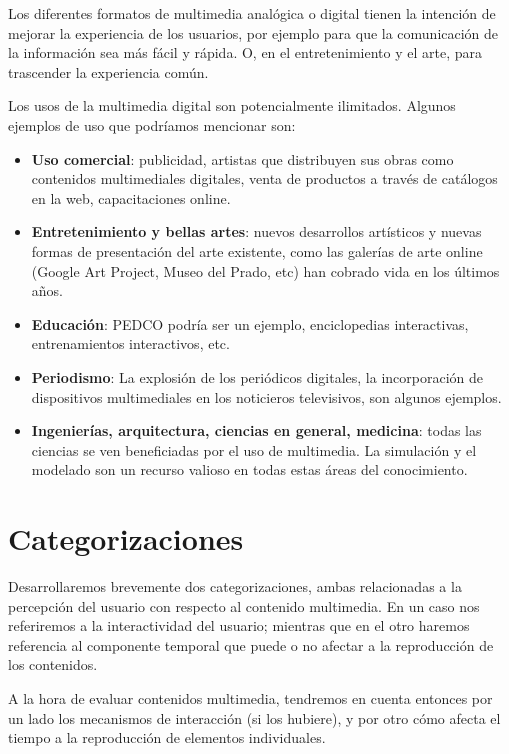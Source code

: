 \documentclass[12pt]{article}
\begin{document}
Los diferentes formatos de multimedia analógica o digital tienen la 
intención de mejorar la experiencia de los usuarios, por ejemplo para 
que la comunicación de la información sea más fácil y rápida. O, en 
el entretenimiento y el arte, para trascender la experiencia común.\cite{wikipmmes} 

Los usos de la multimedia digital son potencialmente ilimitados. Algunos 
ejemplos de uso que podríamos mencionar son:  

\begin{itemize}
\item {\bf Uso comercial}: publicidad, artistas que distribuyen sus obras como contenidos 
multimediales digitales, venta de productos a través de catálogos en la web, capacitaciones online. 
\item {\bf Entretenimiento y bellas artes}: nuevos desarrollos artísticos y nuevas formas 
de presentación del arte existente, como las galerías de arte online (Google Art Project, 
Museo del Prado, etc) han cobrado vida en los últimos años.  
\item {\bf Educación}: PEDCO podría ser un ejemplo, enciclopedias interactivas, entrenamientos
interactivos, etc. 
\item {\bf Periodismo}: La explosión de los periódicos digitales, la incorporación de dispositivos 
multimediales en los noticieros televisivos, son algunos ejemplos. 
\item {\bf Ingenierías, arquitectura, ciencias en general, medicina}: todas las ciencias se ven 
beneficiadas por el uso de multimedia. La simulación y el modelado son un recurso 
valioso en todas estas áreas del conocimiento. 
\end{itemize}


\section*{Categorizaciones}

Desarrollaremos brevemente dos categorizaciones, ambas relacionadas a la 
percepción del usuario con respecto al contenido multimedia. En un caso 
nos referiremos a la interactividad del usuario; mientras que en el otro 
haremos referencia al componente temporal que puede o no afectar a la
reproducción de los contenidos. 

A la hora de evaluar contenidos multimedia, tendremos en cuenta entonces
por un lado los mecanismos de interacción (si los hubiere), y por otro 
cómo afecta el tiempo a la reproducción de elementos individuales. 
\end{document}
